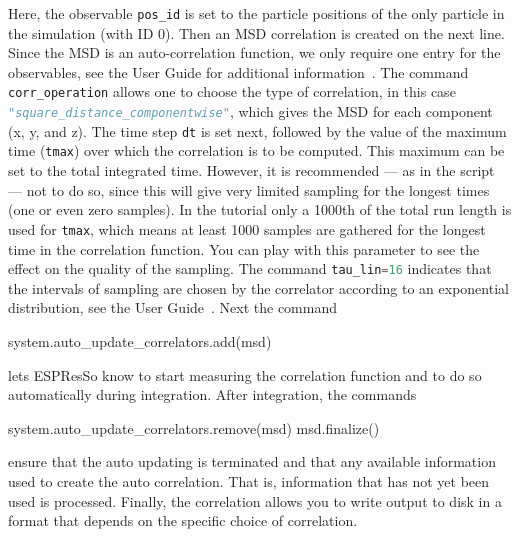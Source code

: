 \documentclass[aip,jcp,reprint,a4paper,onecolumn,amsmath]{revtex4-1}
\newcommand{\es}{\mbox{\textsf{ESPResSo}}\xspace}
\newcommand\codees{\lstinline[language=python]}
\begin{document}
Here, the observable \codees{pos_id} is set to the particle positions of the only particle in the simulation (with ID 0). Then an MSD correlation is created on the next line. Since the MSD is an auto-correlation function, we only require one entry for the observables, see the User Guide for additional information~\cite{UG}. The command \codees{corr_operation} allows one to choose the type of correlation, in this case \codees{"square_distance_componentwise"}, which gives the MSD for each component (x, y, and z). The time step \codees{dt} is set next, followed by the value of the maximum time (\codees{tmax}) over which the correlation is to be computed. This maximum can be set to the total integrated time. However, it is recommended --- as in the script --- not to do so, since this will give very limited sampling for the longest times (one or even zero samples). In the tutorial only a 1000th of the total run length is used for \codees{tmax}, which means at least 1000 samples are gathered for the longest time in the correlation function. You can play with this parameter to see the effect on the quality of the sampling. The command \codees{tau_lin=16} indicates that the intervals of sampling are chosen by the correlator according to an exponential distribution, see the User Guide~\cite{UG}. Next the command
\begin{espresso}
system.auto_update_correlators.add(msd)
\end{espresso}
lets \es{} know to start measuring the correlation function and to do so automatically during integration. After integration, the commands
\begin{espresso}
system.auto_update_correlators.remove(msd)
msd.finalize()
\end{espresso}
ensure that the auto updating is terminated and that any available information used to create the auto correlation. That is, information that has not yet been used is processed. Finally, the correlation allows you to write output to disk in a format that depends on the specific choice of correlation.
\end{document}
